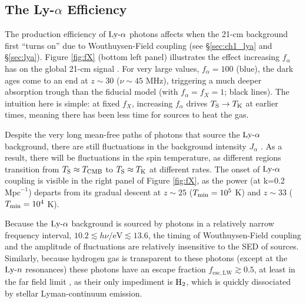 \subsection{The Ly-$\alpha$ Efficiency}
The production efficiency of $\text{Ly-}\alpha$ photons affects when the 21-cm background first ``turns on'' due to Wouthuysen-Field coupling (see \S\ref{sec:ch1_lya} and \S\ref{sec:lya}). Figure \ref{fig:fX} (bottom left panel) illustrates the effect increasing $f_{\alpha}$ has on the global 21-cm signal \cite{Pritchard2010}. For very large values, $f_{\alpha} = 100$ (blue), the dark ages come to an end at $z \sim 30$ ($\nu \sim 45$ MHz), triggering a much deeper absorption trough than the fiducial model (with $f_{\alpha} = f_X = 1$; black lines). The intuition here is simple: at fixed $f_X$, increasing $f_{\alpha}$ drives $T_{\text{S}} \rightarrow T_{\text{K}}$ at earlier times, meaning there has been less time for sources to heat the gas. 

Despite the very long mean-free paths of photons that source the $\text{Ly-}\alpha$ background, there are still fluctuations in the background intensity $J_{\alpha}$ \cite{Barkana2005,Ahn2009,Holzbauer2012}. As a result, there will be fluctuations in the spin temperature, as different regions transition from $T_{\text{S}} \approx T_{\text{CMB}}$ to $T_{\text{S}} \approx T_{\text{K}}$ at different rates. The onset of $\text{Ly-}\alpha$ coupling is visible in the right panel of Figure \ref{fig:fX}, as the power (at k=0.2 $\mathrm{Mpc}^{-1}$) departs from its gradual descent at $z \sim 25$ ($T_{\min} = 10^{5}$ K) and $z \sim 33$ ($T_{\min} = 10^4$ K).

Because the $\text{Ly-}\alpha$ background is sourced by photons in a relatively narrow frequency interval, $10.2 \lesssim h \nu / \mathrm{eV} \lesssim 13.6$, the timing of Wouthuysen-Field coupling and the amplitude of fluctuations are relatively insensitive to the SED of sources. Similarly, because hydrogen gas is transparent to these photons (except at the $\text{Ly-}n$ resonances) these photons have an escape fraction $f_{\mathrm{esc,LW}} \gtrsim 0.5$, at least in the far field limit \cite{Schauer2015}, as their only impediment is $\text{H}_2$, which is quickly dissociated by stellar Lyman-continuum emission.

